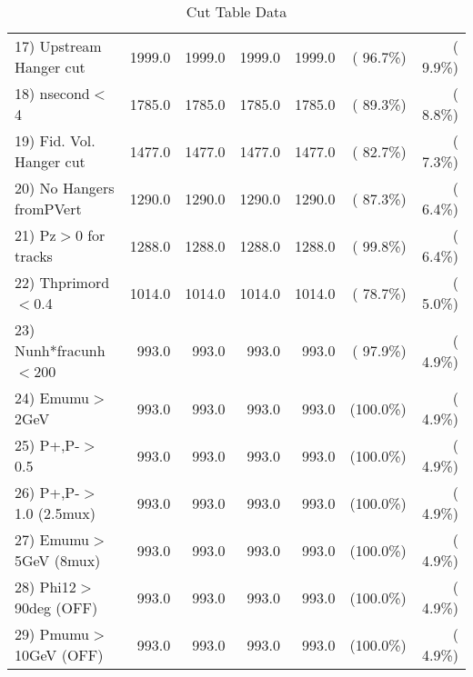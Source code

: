 \begin{table}[h!]
\begin{tabular}{||l||r|r|r|r|r|r||}
 17) Upstream Hanger cut  &       1999.0 &       1999.0 &       1999.0 &       1999.0 & ( 96.7\%) & (  9.9\%) \\
 18) nsecond$<$4          &       1785.0 &       1785.0 &       1785.0 &       1785.0 & ( 89.3\%) & (  8.8\%) \\
 19) Fid. Vol. Hanger cut &       1477.0 &       1477.0 &       1477.0 &       1477.0 & ( 82.7\%) & (  7.3\%) \\
 20) No Hangers fromPVert &       1290.0 &       1290.0 &       1290.0 &       1290.0 & ( 87.3\%) & (  6.4\%) \\
 21) Pz$>$0 for tracks    &       1288.0 &       1288.0 &       1288.0 &       1288.0 & ( 99.8\%) & (  6.4\%) \\
 22) Thprimord$<$0.4      &       1014.0 &       1014.0 &       1014.0 &       1014.0 & ( 78.7\%) & (  5.0\%) \\
 23) Nunh*fracunh$<$200   &        993.0 &        993.0 &        993.0 &        993.0 & ( 97.9\%) & (  4.9\%) \\
 24) Emumu$>$2GeV         &        993.0 &        993.0 &        993.0 &        993.0 & (100.0\%) & (  4.9\%) \\
 25) P+,P-$>$0.5          &        993.0 &        993.0 &        993.0 &        993.0 & (100.0\%) & (  4.9\%) \\
 26) P+,P-$>$1.0 (2.5mux) &        993.0 &        993.0 &        993.0 &        993.0 & (100.0\%) & (  4.9\%) \\
 27) Emumu$>$5GeV  (8mux) &        993.0 &        993.0 &        993.0 &        993.0 & (100.0\%) & (  4.9\%) \\
 28) Phi12$>$90deg  (OFF) &        993.0 &        993.0 &        993.0 &        993.0 & (100.0\%) & (  4.9\%) \\
 29) Pmumu$>$10GeV  (OFF) &        993.0 &        993.0 &        993.0 &        993.0 & (100.0\%) & (  4.9\%) \\
 \hline
 \hline
 \end{tabular}
 \caption{Cut Table  Data     }
 \label{tab-cutcohjpsi-mumu_data}
 \end{table}
